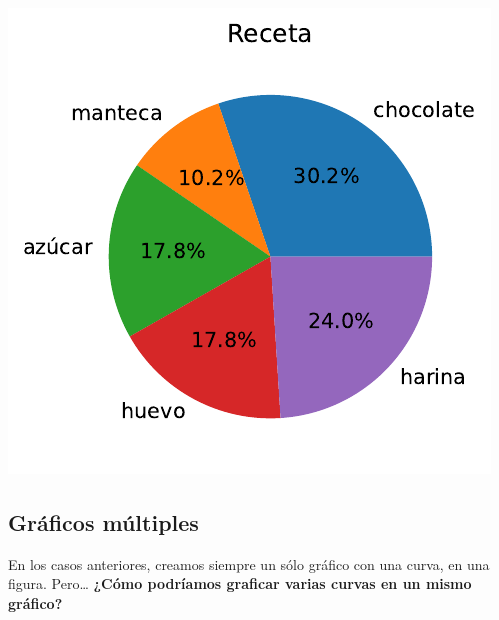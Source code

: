 \documentclass[
  letterpaper,
  DIV=11,
  numbers=noendperiod]{scrreprt}
\begin{document}
\includegraphics{unidad_6_files/figure-pdf/cell-121-output-1.pdf}

\subsection{Gráficos múltiples}\label{gruxe1ficos-muxfaltiples}

En los casos anteriores, creamos siempre un sólo gráfico con una curva,
en una figura. Pero\ldots{} \textbf{¿Cómo podríamos graficar varias
curvas en un mismo gráfico?}
\end{document}
